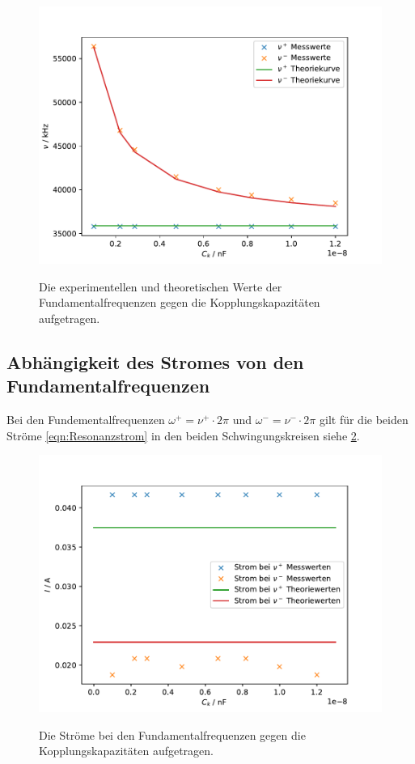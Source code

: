 \documentclass[titlepage = firstcover]{scrartcl}
\begin{document}
        \begin{figure}[h]
            \centering
            \caption{Die experimentellen und theoretischen Werte der Fundamentalfrequenzen gegen die Kopplungskapazitäten aufgetragen.}
            \includegraphics[width = 0.8\linewidth]{Frequenzverlauf.pdf}
            \label{fig:Stromverlauf}
        \end{figure}
        \FloatBarrier
        \noindent

    \subsection{Abhängigkeit des Stromes von den Fundamentalfrequenzen}
        Bei den Fundementalfrequenzen $\omega^+ = \nu^+ \cdot 2\pi$ und $\omega^- = \nu^- \cdot 2\pi$ gilt für die beiden Ströme \ref{eqn:Resonanzstrom}
        in den beiden Schwingungskreisen siehe \ref{fig:Stromverlauf}.
        \begin{figure}[h]
            \centering
            \caption{Die Ströme bei den Fundamentalfrequenzen gegen die Kopplungskapazitäten aufgetragen.}
            \includegraphics[width = 0.8\linewidth]{Stromverlauf.pdf}
            \label{fig:Stromverlauf}
        \end{figure}
\end{document}
